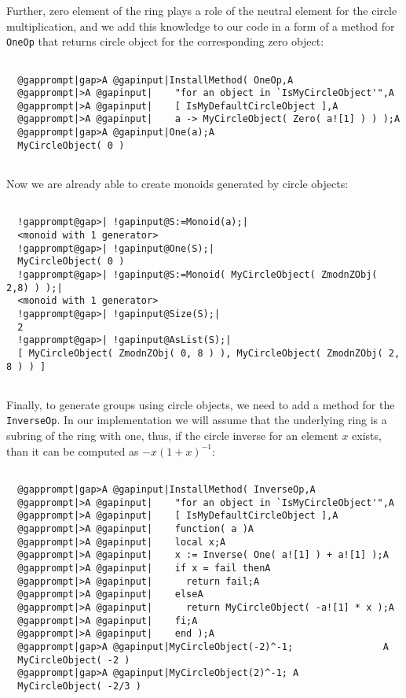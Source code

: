 \documentclass[a4paper,11pt]{report}
\begin{document}
{{\begin{Verbatim}[commandchars=@|A,fontsize=\small,frame=single,label=Example]
\end{Verbatim}
 Further, zero element of the ring plays a role of the neutral element for the
circle multiplication, and we add this knowledge to our code in a form of a
method for \texttt{OneOp} that returns circle object for the corresponding zero object: 
\begin{Verbatim}[commandchars=@|A,fontsize=\small,frame=single,label=Example]
  
  @gapprompt|gap>A @gapinput|InstallMethod( OneOp,A
  @gapprompt|>A @gapinput|    "for an object in `IsMyCircleObject'",A
  @gapprompt|>A @gapinput|    [ IsMyDefaultCircleObject ],A
  @gapprompt|>A @gapinput|    a -> MyCircleObject( Zero( a![1] ) ) );A
  @gapprompt|gap>A @gapinput|One(a);A
  MyCircleObject( 0 )
  
\end{Verbatim}
 Now we are already able to create monoids generated by circle objects: 
\begin{Verbatim}[commandchars=!@|,fontsize=\small,frame=single,label=Example]
  
  !gapprompt@gap>| !gapinput@S:=Monoid(a);|
  <monoid with 1 generator>
  !gapprompt@gap>| !gapinput@One(S);|
  MyCircleObject( 0 )
  !gapprompt@gap>| !gapinput@S:=Monoid( MyCircleObject( ZmodnZObj( 2,8) ) );|
  <monoid with 1 generator>
  !gapprompt@gap>| !gapinput@Size(S);|
  2
  !gapprompt@gap>| !gapinput@AsList(S);|
  [ MyCircleObject( ZmodnZObj( 0, 8 ) ), MyCircleObject( ZmodnZObj( 2, 8 ) ) ]
  
\end{Verbatim}
 Finally, to generate groups using circle objects, we need to add a method for
the \texttt{InverseOp}. In our implementation we will assume that the underlying ring is a subring
of the ring with one, thus, if the circle inverse for an element $x$ exists, than it can be computed as $-x(1+x)^{-1}$: 
\begin{Verbatim}[commandchars=@|A,fontsize=\small,frame=single,label=Example]
  
  @gapprompt|gap>A @gapinput|InstallMethod( InverseOp,A
  @gapprompt|>A @gapinput|    "for an object in `IsMyCircleObject'",A
  @gapprompt|>A @gapinput|    [ IsMyDefaultCircleObject ],A
  @gapprompt|>A @gapinput|    function( a )A
  @gapprompt|>A @gapinput|    local x;A
  @gapprompt|>A @gapinput|    x := Inverse( One( a![1] ) + a![1] );A
  @gapprompt|>A @gapinput|    if x = fail thenA
  @gapprompt|>A @gapinput|      return fail;A
  @gapprompt|>A @gapinput|    elseA
  @gapprompt|>A @gapinput|      return MyCircleObject( -a![1] * x );A
  @gapprompt|>A @gapinput|    fi;A
  @gapprompt|>A @gapinput|    end );A
  @gapprompt|gap>A @gapinput|MyCircleObject(-2)^-1;                A
  MyCircleObject( -2 )
  @gapprompt|gap>A @gapinput|MyCircleObject(2)^-1; A
  MyCircleObject( -2/3 )
  

\end{Verbatim}}}
\end{document}
